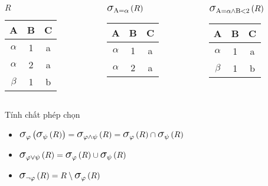\documentclass[11pt]{beamer}
\newcommand{\mmm}[1]{\mathlarger{\mathlarger{\mathlarger#1}}}%
\newcommand{\psig}[2]{\mmm{\sigma}_{#1}\left(#2\right)}%
\begin{document}
  \begin{frame}
    \begin{columns}[T]
      \begin{column}{0.3\textwidth}
        \centering $R$
        \bigskip \\
        \begin{tabular}{||c|c|c||}
          \hline
          \textbf{A} & \textbf{B} & \textbf{C}  \\[0.5ex] \hline\hline
          $\alpha$ & 1 & a\\ \hline
          $\alpha$ & 2 & a\\ \hline
          $\beta$ & 1 & b\\ \hline
        \end{tabular}
      \end{column}
      \begin{column}{0.3\textwidth}
        \centering $\psig{\text{A} = \alpha}{R}$
        \medskip \\
        \begin{tabular}{||c|c|c||}
          \hline
          \textbf{A} & \textbf{B} & \textbf{C} \\[0.5ex] \hline\hline
          $\alpha$ & 1 & a\\ \hline
          $\alpha$ & 2 & a\\ \hline
        \end{tabular}
      \end{column}
      \begin{column}{0.3\textwidth}
        \centering $\psig{\text{A} = \alpha \wedge \text{B} < 2}{R}$
        \medskip \\
        \begin{tabular}{||c|c|c||}
          \hline
          \textbf{A} & \textbf{B} & \textbf{C} \\[0.5ex] \hline\hline
          $\alpha$ & 1 & a\\ \hline
          $\beta$ & 1 & b\\ \hline
        \end{tabular}
      \end{column}
    \end{columns}
  \end{frame}
  \begin{frame}{Tính chất phép chọn}
    \begin{itemize}
      \item<2-> $\psig{\varphi}{\psig{\psi}{R}} = \psig{\varphi \wedge \psi}{R} = \psig{\varphi}{R} \cap \psig{\psi}{R}$
      \item<3-> $\psig{\varphi \vee \psi}{R} = \psig{\varphi}{R} \cup \psig{\psi}{R}$
      \item<4-> $\psig{\neg \varphi}{R} = R \setminus \psig{\varphi}{R}$
    \end{itemize}
  \end{frame}
\end{document}
